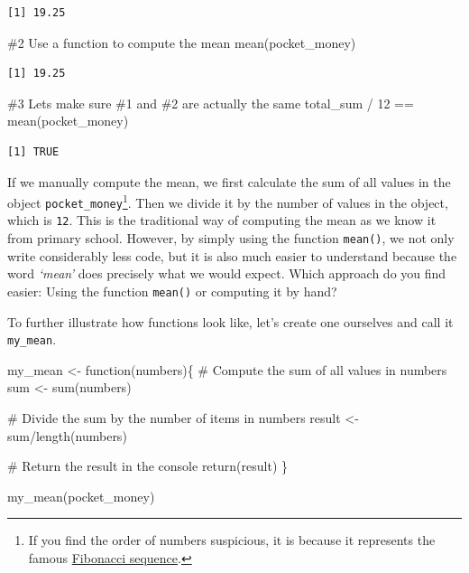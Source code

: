 \documentclass[
  letterpaper,
  DIV=11,
  numbers=noendperiod]{scrreprt}
\newenvironment{Shaded}{\begin{snugshade}}{\end{snugshade}}
\newcommand{\CommentTok}[1]{\textcolor[rgb]{0.37,0.37,0.37}{#1}}
\newcommand{\ControlFlowTok}[1]{\textcolor[rgb]{0.00,0.23,0.31}{#1}}
\newcommand{\DecValTok}[1]{\textcolor[rgb]{0.68,0.00,0.00}{#1}}
\newcommand{\FunctionTok}[1]{\textcolor[rgb]{0.28,0.35,0.67}{#1}}
\newcommand{\NormalTok}[1]{\textcolor[rgb]{0.00,0.23,0.31}{#1}}
\newcommand{\OtherTok}[1]{\textcolor[rgb]{0.00,0.23,0.31}{#1}}
\newcommand{\SpecialCharTok}[1]{\textcolor[rgb]{0.37,0.37,0.37}{#1}}
\begin{document}
\begin{verbatim}
[1] 19.25
\end{verbatim}

\begin{Shaded}
\begin{Highlighting}[]
\CommentTok{\#2 Use a function to compute the mean}
\FunctionTok{mean}\NormalTok{(pocket\_money)}
\end{Highlighting}
\end{Shaded}

\begin{verbatim}
[1] 19.25
\end{verbatim}

\begin{Shaded}
\begin{Highlighting}[]
\CommentTok{\#3 Let\textquotesingle{}s make sure \#1 and \#2 are actually the same}
\NormalTok{total\_sum }\SpecialCharTok{/} \DecValTok{12} \SpecialCharTok{==} \FunctionTok{mean}\NormalTok{(pocket\_money)}
\end{Highlighting}
\end{Shaded}

\begin{verbatim}
[1] TRUE
\end{verbatim}

If we manually compute the mean, we first calculate the sum of all
values in the object \texttt{pocket\_money}\footnote{If you find the
  order of numbers suspicious, it is because it represents the famous
  \href{https://en.wikipedia.org/wiki/Fibonacci_number}{Fibonacci
  sequence}.}. Then we divide it by the number of values in the object,
which is \texttt{12}. This is the traditional way of computing the mean
as we know it from primary school. However, by simply using the function
\texttt{mean()}, we not only write considerably less code, but it is
also much easier to understand because the word \emph{`mean'} does
precisely what we would expect. Which approach do you find easier: Using
the function \texttt{mean()} or computing it by hand?

To further illustrate how functions look like, let's create one
ourselves and call it \texttt{my\_mean}.

\begin{Shaded}
\begin{Highlighting}[]
\NormalTok{my\_mean }\OtherTok{\textless{}{-}} \ControlFlowTok{function}\NormalTok{(numbers)\{}
  \CommentTok{\# Compute the sum of all values in \textquotesingle{}numbers\textquotesingle{}}
\NormalTok{  sum }\OtherTok{\textless{}{-}} \FunctionTok{sum}\NormalTok{(numbers)}
  
  \CommentTok{\# Divide the sum by the number of items in \textquotesingle{}numbers\textquotesingle{}}
\NormalTok{  result }\OtherTok{\textless{}{-}}\NormalTok{ sum}\SpecialCharTok{/}\FunctionTok{length}\NormalTok{(numbers)}
  
  \CommentTok{\# Return the result in the console}
  \FunctionTok{return}\NormalTok{(result)}
\NormalTok{\}}

\FunctionTok{my\_mean}\NormalTok{(pocket\_money)}
\end{Highlighting}
\end{Shaded}
\end{document}
